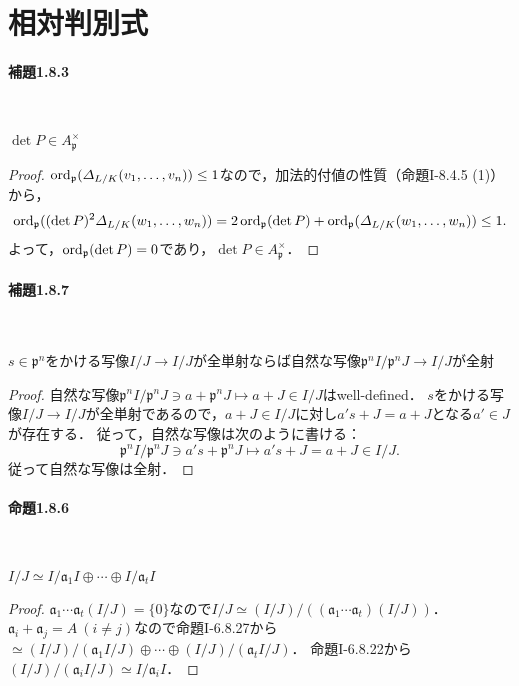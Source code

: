 \section{相対判別式}
\paragraph{補題1.8.3}~
\begin{screen}
  $\det P\in A_\mathfrak{p}^\times$
\end{screen}
\begin{proof}
  $\operatorname{ord}_\mathfrak{p}(\varDelta_{L/K}(v_1, \ldots, v_n))\leq 1$なので，加法的付値の性質（命題I-8.4.5 (1)）から，
  \[\operatorname{ord}_\mathfrak{p}((\det P)^2\varDelta_{L/K}(w_1, \ldots, w_n)) = 2\operatorname{ord}_\mathfrak{p}(\det P) + \operatorname{ord}_\mathfrak{p}(\varDelta_{L/K}(w_1, \ldots, w_n))\leq 1.\]
  よって，$\operatorname{ord}_\mathfrak{p}(\det P) = 0$であり，$\det P\in A_\mathfrak{p}^\times$．
\end{proof}

\paragraph{補題1.8.7}~
\begin{screen}
  $s\in\mathfrak{p}^n$をかける写像$I/J\to I/J$が全単射ならば自然な写像$\mathfrak{p}^nI/\mathfrak{p}^nJ\to I/J$が全射
\end{screen}
\begin{proof}
  自然な写像$\mathfrak{p}^nI/\mathfrak{p}^nJ\ni a + \mathfrak{p}^nJ\mapsto a + J\in I/J$はwell-defined．
  $s$をかける写像$I/J\to I/J$が全単射であるので，$a + J\in I/J$に対し$a's + J = a + J$となる$a'\in J$が存在する．
  従って，自然な写像は次のように書ける：
  \[\mathfrak{p}^nI/\mathfrak{p}^nJ\ni a's + \mathfrak{p}^nJ\mapsto a's + J = a + J\in I/J.\]
  従って自然な写像は全射．
\end{proof}

\paragraph{命題1.8.6}~
\begin{screen}
  $I/J\simeq I/\mathfrak{a}_1I\oplus\cdots\oplus I/\mathfrak{a}_tI$
\end{screen}
\begin{proof}
  $\mathfrak{a}_1\cdots\mathfrak{a}_t(I/J) = \{0\}$なので$I/J\simeq (I/J)/((\mathfrak{a}_1\cdots\mathfrak{a}_t)(I/J))$．
  $\mathfrak{a}_i + \mathfrak{a}_j = A\ (i\neq j)$なので命題I-6.8.27から$\simeq (I/J)/(\mathfrak{a}_1I/J)\oplus\cdots\oplus(I/J)/(\mathfrak{a}_tI/J)$．
  命題I-6.8.22から$(I/J)/(\mathfrak{a}_iI/J)\simeq I/\mathfrak{a}_iI$．
\end{proof}


